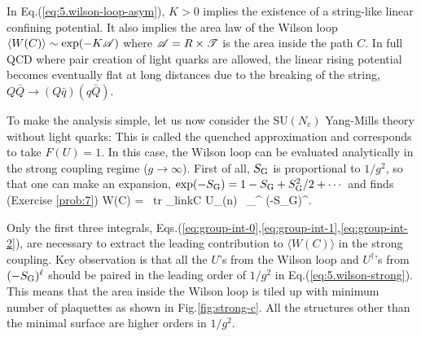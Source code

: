 In Eq.(\ref{eq:5.wilson-loop-asym}), 
   $K > 0$  implies 
 the existence of a string-like
linear confining potential.
 It also implies 
 the area law  of the Wilson loop 
 $\langle W(C) \rangle \sim \exp(-K{\cal A})$
 where ${\cal A}= R \times {\cal T} $ is 
  the area inside the path $C$.
    In full QCD where pair creation of light quarks 
 are allowed,  
  the linear rising potential becomes eventually 
    flat at long distances due to the breaking of the string,
  $Q\bar{Q} \rightarrow (Q\bar{q})(q\bar{Q})$.
  
  To make the analysis simple, let us now consider the 
  SU$(N_c)$ Yang-Mills theory
  without light quarks: This is called the quenched 
  approximation and corresponds to take $F(U) =1$.
In this case,  the Wilson loop can be evaluated analytically
 in the strong coupling regime ($g \rightarrow \infty$).
First of all,  $S_{\rm G}$ is proportional to $1/g^2$,
so that  one can make an expansion,  
$\exp (-S_{\rm G}) = 1 - S_{\rm G}+ S_{\rm G}^2 /2 + \cdots $
 and finds (Exercise \ref{prob:7})
\beq
\label{eq:5.wilson-strong}
\langle W(C) \rangle = 
 \int [dU] \ {\rm tr} \prod_{{\rm link}\in C} U_{\mu}(n) \  
 \sum_{}^{\infty}  (-S_{\rm G})^{\ell}.
\eeq
 
Only the first three integrals, Eqs.(\ref{eq:group-int-0},\ref{eq:group-int-1},\ref{eq:group-int-2}),
 are necessary to extract the leading contribution to 
 $\langle W(C) \rangle $  in the strong coupling.
   Key observation is that all the $U$'s 
  from the Wilson loop and $U^{\dagger}$'s 
 from $(-S_{\rm G})^{\ell}$ should be paired in the leading order of $1/g^2$
 in   Eq.(\ref{eq:5.wilson-strong}).
  This means that the area inside the Wilson loop is tiled up 
 with minimum number of plaquettes as shown in
  Fig.\ref{fig:strong-c}. All the structures other than 
  the minimal surface are higher orders in  $1/g^2$.

